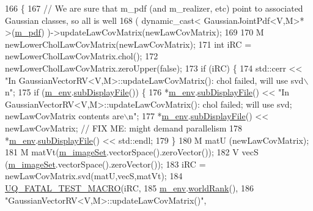 \begin{DoxyCode}
166 \{
167   \textcolor{comment}{// We are sure that m\_pdf (and m\_realizer, etc) point to associated Gaussian classes, so all is well}
168   ( \textcolor{keyword}{dynamic\_cast<} GaussianJointPdf<V,M>* \textcolor{keyword}{>}(\hyperlink{class_q_u_e_s_o_1_1_base_vector_r_v_a0ca926bca6fbcc688be6fc7496449e8e}{m\_pdf}) )->updateLawCovMatrix(newLawCovMatrix);
169 
170   M newLowerCholLawCovMatrix(newLawCovMatrix);
171   \textcolor{keywordtype}{int} iRC = newLowerCholLawCovMatrix.chol();
172   newLowerCholLawCovMatrix.zeroUpper(\textcolor{keyword}{false});
173   \textcolor{keywordflow}{if} (iRC) \{
174     std::cerr << \textcolor{stringliteral}{"In GaussianVectorRV<V,M>::updateLawCovMatrix(): chol failed, will use svd\(\backslash\)n"};
175     \textcolor{keywordflow}{if} (\hyperlink{class_q_u_e_s_o_1_1_base_vector_r_v_a556761c50e2d171977ef5f19a63c8c73}{m\_env}.\hyperlink{class_q_u_e_s_o_1_1_base_environment_a8a0064746ae8dddfece4229b9ad374d6}{subDisplayFile}()) \{
176       *\hyperlink{class_q_u_e_s_o_1_1_base_vector_r_v_a556761c50e2d171977ef5f19a63c8c73}{m\_env}.\hyperlink{class_q_u_e_s_o_1_1_base_environment_a8a0064746ae8dddfece4229b9ad374d6}{subDisplayFile}() << \textcolor{stringliteral}{"In GaussianVectorRV<V,M>::updateLawCovMatrix(): chol
       failed; will use svd; newLawCovMatrix contents are\(\backslash\)n"};
177       *\hyperlink{class_q_u_e_s_o_1_1_base_vector_r_v_a556761c50e2d171977ef5f19a63c8c73}{m\_env}.\hyperlink{class_q_u_e_s_o_1_1_base_environment_a8a0064746ae8dddfece4229b9ad374d6}{subDisplayFile}() << newLawCovMatrix; \textcolor{comment}{// FIX ME: might demand parallelism}
178       *\hyperlink{class_q_u_e_s_o_1_1_base_vector_r_v_a556761c50e2d171977ef5f19a63c8c73}{m\_env}.\hyperlink{class_q_u_e_s_o_1_1_base_environment_a8a0064746ae8dddfece4229b9ad374d6}{subDisplayFile}() << std::endl;
179     \}
180     M matU (newLawCovMatrix);
181     M matVt(\hyperlink{class_q_u_e_s_o_1_1_base_vector_r_v_ad31872bb4da22d47528cb9d691b3b7ff}{m\_imageSet}.vectorSpace().zeroVector());
182     V vecS (\hyperlink{class_q_u_e_s_o_1_1_base_vector_r_v_ad31872bb4da22d47528cb9d691b3b7ff}{m\_imageSet}.vectorSpace().zeroVector());
183     iRC = newLawCovMatrix.svd(matU,vecS,matVt);
184     \hyperlink{_defines_8h_a56d63d18d0a6d45757de47fcc06f574d}{UQ\_FATAL\_TEST\_MACRO}(iRC,
185                         \hyperlink{class_q_u_e_s_o_1_1_base_vector_r_v_a556761c50e2d171977ef5f19a63c8c73}{m\_env}.\hyperlink{class_q_u_e_s_o_1_1_base_environment_a78b57112bbd0e6dd0e8afec00b40ffa7}{worldRank}(),
186                         \textcolor{stringliteral}{"GaussianVectorRV<V,M>::updateLawCovMatrix()"},

\end{DoxyCode}
